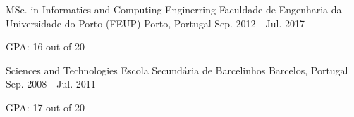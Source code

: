 \begin{cventries}
	
    \cventry
    {MSc. in Informatics and Computing Enginerring} %
    {Faculdade de Engenharia da Universidade do Porto (FEUP)} %
    {Porto, Portugal} %
    {Sep. 2012 - Jul. 2017} %
    {
      \begin{cvitems}
        \item {GPA: 16 out of 20}
      \end{cvitems}
    }

    \cventry
    {Sciences and Technologies} %
    {Escola Secundária de Barcelinhos} %
    {Barcelos, Portugal} %
    {Sep. 2008 - Jul. 2011} %
    {
        \begin{cvitems} 
            \item {GPA: 17 out of 20}
        \end{cvitems}
    }
    
\end{cventries}

